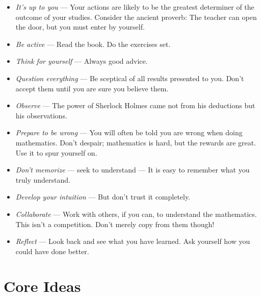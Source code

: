 		\begin{itemize}
		
			\item \emph{It’s up to you} --- Your actions are likely to be the greatest determiner of the outcome of your studies. Consider the ancient proverb: The teacher can open the door, but you must enter by yourself.
			
			\item  \emph{Be active} --- Read the book. Do the exercises set.

			\item  \emph{Think for yourself} --- Always good advice.

			\item  \emph{Question everything} --- Be sceptical of all results presented to you. Don’t accept them until you are sure you believe them.

			\item  \emph{Observe} --- The power of Sherlock Holmes came not from his deductions but his
observations.

			\item  \emph{Prepare to be wrong} --- You will often be told you are wrong when doing mathematics. Don’t despair; mathematics is hard, but the rewards are great. Use it to spur yourself on.

			\item  \emph{Don't memorize} --- seek to understand --- It is easy to remember what you truly understand.
			
			\item  \emph{Develop your intuition} --- But don’t trust it completely.

			\item  \emph{Collaborate} --- Work with others, if you can, to understand the mathematics. This isn't a competition. Don’t merely copy from them though!
			
			\item  \emph{Reflect} --- Look back and see what you have learned. Ask yourself how you could have
done better.

		\end{itemize}
			
	
\section{Core Ideas}


